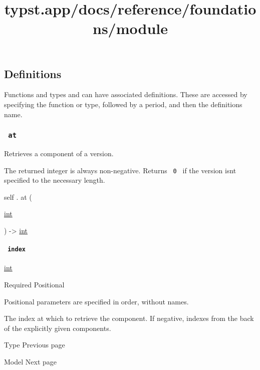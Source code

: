\subsection{\texorpdfstring{{ Definitions
}}{ Definitions }}\label{definitions}

\label{definitions-tooltip}
Functions and types and can have associated definitions. These are
accessed by specifying the function or type, followed by a period, and
then the definition\textquotesingle s name.

\subsubsection{\texorpdfstring{\texttt{\ at\ }}{ at }}\label{definitions-at}

Retrieves a component of a version.

The returned integer is always non-negative. Returns \texttt{\ 0\ } if
the version isn\textquotesingle t specified to the necessary length.

self { . } { at } (

{ \href{/docs/reference/foundations/int/}{int} }

) -\textgreater{} \href{/docs/reference/foundations/int/}{int}

\paragraph{\texorpdfstring{\texttt{\ index\ }}{ index }}\label{definitions-at-index}

\href{/docs/reference/foundations/int/}{int}

{Required} {{ Positional }}

\label{definitions-at-index-positional-tooltip}
Positional parameters are specified in order, without names.

The index at which to retrieve the component. If negative, indexes from
the back of the explicitly given components.

\href{/docs/reference/foundations/type/}{\pandocbounded{}}

{ Type } { Previous page }

\href{/docs/reference/model/}{\pandocbounded{}}

{ Model } { Next page }


\title{typst.app/docs/reference/foundations/module}

